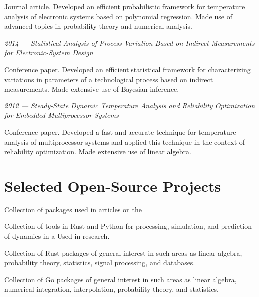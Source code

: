 \documentclass[journal]{IEEEtran}
\begin{document}
Journal article. Developed an efficient probabilistic framework for temperature
analysis of electronic systems based on polynomial regression. Made use of
advanced topics in probability theory and numerical analysis.

\emph{2014 --- Statistical Analysis of Process Variation Based on Indirect
Measurements for Electronic-System Design} \cite{ukhov2014a}

Conference paper. Developed an efficient statistical framework for
characterizing variations in parameters of a technological process based on
indirect measurements. Made extensive use of Bayesian inference.

\emph{2012 --- Steady-State Dynamic Temperature Analysis and Reliability
Optimization for Embedded Multiprocessor Systems} \cite{ukhov2012}

Conference paper. Developed a fast and accurate technique for temperature
analysis of multiprocessor systems and applied this technique in the context of
reliability optimization. Made extensive use of linear algebra.

\section{Selected Open-Source Projects}

\emph{}

Collection of packages used in articles on the

\emph{}

Collection of tools in Rust and Python for processing, simulation, and
prediction of dynamics in a
 Used in
research.

\emph{}

Collection of Rust packages of general interest in such areas as linear algebra,
probability theory, statistics, signal processing, and databases.

\emph{}

Collection of Go packages of general interest in such areas as linear algebra,
numerical integration, interpolation, probability theory, and statistics.
\end{document}
